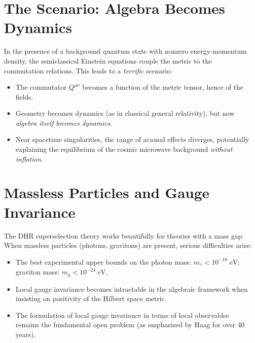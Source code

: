 \documentclass[11pt,a4paper]{article}
\begin{document}
\section{The Scenario: Algebra Becomes Dynamics}

In the presence of a background quantum state with nonzero energy-momentum
density, the semiclassical Einstein equations couple the metric to the
commutation relations. This leads to a \emph{terrific} scenario:
\begin{itemize}[nosep]
  \item The commutator $Q^{\mu\nu}$ becomes a function of the metric tensor,
        hence of the fields.
  \item Geometry becomes dynamics (as in classical general relativity),
        but now \emph{algebra itself becomes dynamics}.
  \item Near spacetime singularities, the range of acausal effects diverges,
        potentially explaining the equilibrium of the cosmic microwave
        background \emph{without inflation}.
\end{itemize}

\section{Massless Particles and Gauge Invariance}

The DHR superselection theory works beautifully for theories with a
mass gap. When massless particles (photons, gravitons) are present,
serious difficulties arise:
\begin{itemize}[nosep]
  \item The best experimental upper bounds on the photon mass:
        $m_\gamma < 10^{-18}\;\text{eV}$;
        graviton mass: $m_g < 10^{-24}\;\text{eV}$.
  \item Local gauge invariance becomes intractable in the algebraic framework
        when insisting on positivity of the Hilbert space metric.
  \item The formulation of local gauge invariance in terms of local
        observables remains the fundamental open problem (as emphasized
        by Haag for over 40 years).
\end{itemize}
\end{document}
